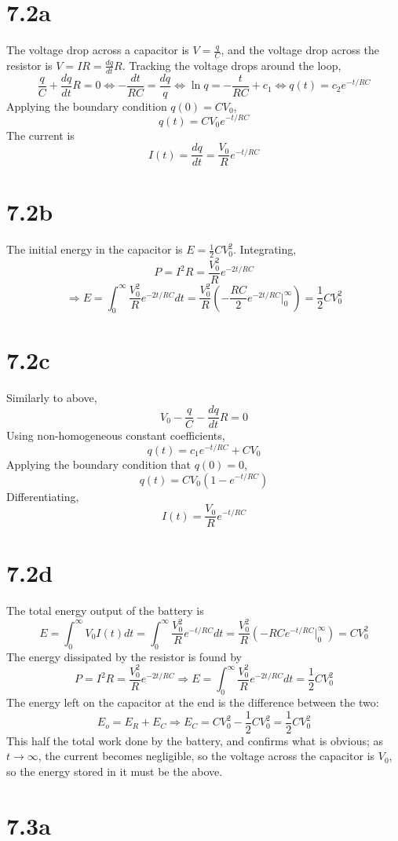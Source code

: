 \documentclass{article}
\begin{document}
\section*{7.2a}
The voltage drop across a capacitor is $ V = \frac{q}{C}$, and the voltage drop across the resistor is $V=IR=\frac{dq}{dt}R$. Tracking the voltage drops around the loop,
\[\frac{q}{C}+\frac{dq}{dt}R=0\Leftrightarrow -\frac{dt}{RC}=\frac{dq}{q}\Leftrightarrow \ln q=-\frac{t}{RC}+c_1\Leftrightarrow q(t)=c_2e^{-{t}/{RC}}\]
Applying the boundary condition $q(0)=CV_0$,
\[q(t)=CV_0e^{-t/RC}\]
The current is
\[I(t)=\frac{dq}{dt}=\frac{V_0}{R}e^{-t/RC}\]

\section*{7.2b}
The initial energy in the capacitor is $E=\frac{1}{2}CV_0^2$. Integrating, \[P=I^2R=\frac{V_0^2}{R}e^{-2t/RC}\]
\[\Rightarrow E=\int_0^\infty\frac{V_0^2}{R}e^{-2t/RC}dt=\frac{V_0^2}{R}\left( -\frac{RC}{2}e^{-2t/RC}\bigg|_0^\infty \right)=\frac{1}{2}CV_0^2\]

\section*{7.2c}
Similarly to above,
\[V_0-\frac{q}{C}-\frac{dq}{dt}R=0\]
Using non-homogeneous constant coefficients,
\[q(t)=c_1e^{-t/RC}+CV_0\]
Applying the boundary condition that $q(0)=0$,
\[q(t)=CV_0(1-e^{-t/RC})\]
Differentiating,
\[I(t)=\frac{V_0}{R}e^{-t/RC}\]

\section*{7.2d}
The total energy output of the battery is
\[E=\int_0^\infty V_0I(t)dt=\int_0^\infty \frac{V_0^2}{R}e^{-t/RC}dt=\frac{V_0^2}{R}\left( -RCe^{-t/RC}\bigg|_0^\infty \right)=C{V_0^2}\]
The energy dissipated by the resistor is found by
\[P=I^2R=\frac{V_0^2}{R}e^{-2t/RC}\Rightarrow E=\int_0^\infty \frac{V_0^2}{R}e^{-2t/RC}dt=\frac{1}{2}CV_0^2\]
The energy left on the capacitor at the end is the difference between the two:
\[E_o=E_R+E_C\Rightarrow E_C=CV_0^2-\frac{1}{2}CV_0^2=\frac{1}{2}CV_0^2\]
This half the total work done by the battery, and confirms what is obvious; as $t\to\infty$, the current becomes negligible, so the voltage across the capacitor is $V_0$, so the energy stored in it must be the above.

\section*{7.3a}
\end{document}
